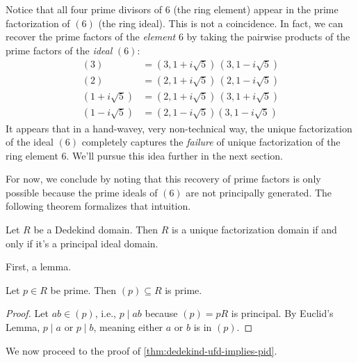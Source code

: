 Notice that all four prime divisors of $6$ (the ring element) appear in the prime factorization of $(6)$ (the ring ideal). This is not a coincidence. In fact, we can recover the prime factors of the \emph{element} $6$ by taking the pairwise products of the prime factors of the \emph{ideal} $(6)$:
\begin{equation}
    \label{eqn:recovering-factors-of-6}
    \begin{aligned}
        (3)             & = (3, 1 + i \sqrt5) \,(3, 1 - i \sqrt5)  \\
        (2)             & = (2, 1 + i \sqrt5) \, (2, 1 - i \sqrt5) \\
        (1 + i \sqrt 5) & = (2, 1 + i \sqrt5) \,(3, 1 + i \sqrt5)  \\
        (1 - i \sqrt 5) & = (2, 1 - i \sqrt5) (3, 1 - i \sqrt5)
    \end{aligned}
\end{equation}
It appears that in a hand-wavey, very non-technical way, the unique factorization of the ideal $(6)$ completely captures the \emph{failure} of unique factorization of the ring element $6$. We'll pursue this idea further in the next section.

For now, we conclude by noting that this recovery of prime factors is only possible because the prime ideals of $(6)$ are not principally generated. The following theorem formalizes that intuition.

\begin{theorem}
    \label{thm:dedekind-ufd-implies-pid}
    Let $R$ be a Dedekind domain. Then $R$ is a unique factorization domain if and only if it's a principal ideal domain.
\end{theorem}

First, a lemma.

\begin{lemma}
    \label{lem:prime-elements-generate-prime-ideals}
    Let $p \in R$ be prime. Then $(p) \subseteq R$ is prime.
\end{lemma}

\begin{proof}
    Let $ab \in (p)$, i.e., $p \mid ab$ because $(p) = pR$ is principal. By Euclid's Lemma, $p \mid a$ or $p \mid b$, meaning either $a$ or $b$ is in $(p)$.
\end{proof}

We now proceed to the proof of \autoref{thm:dedekind-ufd-implies-pid}.

